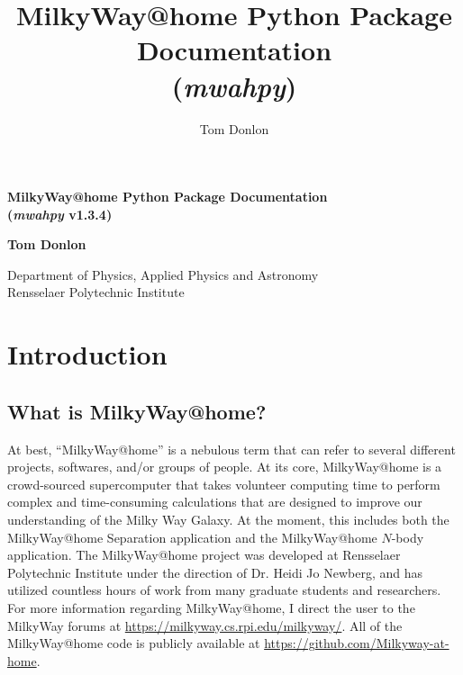 \documentclass{article}
\author{Tom Donlon}
\title{MilkyWay@home Python Package Documentation \\ (\textit{mwahpy})}
\date{}
\begin{document}
\newcommand{\mwahpy}[0]{\textit{mwahpy }}
\newcommand{\msol}{$M_\odot$}

\begin{titlepage}
   \begin{center}
       \vspace*{5cm}

       \huge\textbf{MilkyWay@home Python Package Documentation \\ (\textit{mwahpy} v1.3.4)}

       \vspace{0.5cm}
        
            
       \vspace{1.5cm}

       \large\textbf{Tom Donlon}
            
       \vspace{0.8cm}
            
       Department of Physics, Applied Physics and Astronomy\\
       Rensselaer Polytechnic Institute
            
   \end{center}
\end{titlepage}

\newpage

\tableofcontents

\newpage

\section{Introduction}

\subsection{What is MilkyWay@home?}

At best, ``MilkyWay@home'' is a nebulous term that can refer to several different projects, softwares, and/or groups of people. At its core, MilkyWay@home is a crowd-sourced supercomputer that takes volunteer computing time to perform complex and time-consuming calculations that are designed to improve our understanding of the Milky Way Galaxy. At the moment, this includes both the MilkyWay@home Separation application and the MilkyWay@home $N$-body application. The MilkyWay@home project was developed at Rensselaer Polytechnic Institute under the direction of Dr. Heidi Jo Newberg, and has utilized countless hours of work from many graduate students and researchers. For more information regarding MilkyWay@home, I direct the user to the MilkyWay forums at \url{https://milkyway.cs.rpi.edu/milkyway/}. All of the MilkyWay@home code is publicly available at \url{https://github.com/Milkyway-at-home}. 
\end{document}
